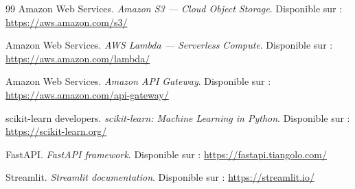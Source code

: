 \documentclass{article}
\begin{document}
\begin{thebibliography}{99}
Amazon Web Services.
\textit{Amazon S3 --- Cloud Object Storage}.
Disponible sur : \url{https://aws.amazon.com/s3/}

Amazon Web Services.
\textit{AWS Lambda --- Serverless Compute}.
Disponible sur : \url{https://aws.amazon.com/lambda/}

Amazon Web Services.
\textit{Amazon API Gateway}.
Disponible sur : \url{https://aws.amazon.com/api-gateway/}

scikit-learn developers.
\textit{scikit-learn: Machine Learning in Python}.
Disponible sur : \url{https://scikit-learn.org/}

FastAPI.
\textit{FastAPI framework}.
Disponible sur : \url{https://fastapi.tiangolo.com/}

Streamlit.
\textit{Streamlit documentation}.
Disponible sur : \url{https://streamlit.io/}

\end{thebibliography}
\end{document}
